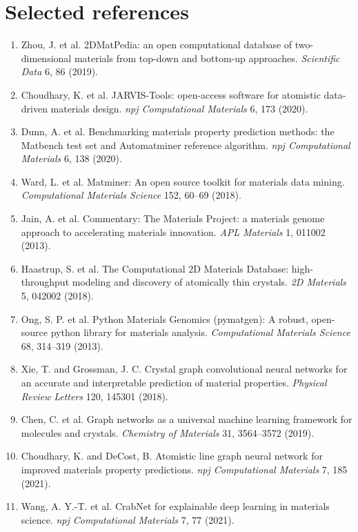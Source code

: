 \documentclass[10pt]{article}
\begin{document}
\section*{Selected references}
\small
\begin{enumerate}[leftmargin=1.2em,itemsep=1pt]
  \item Zhou, J. et al. 2DMatPedia: an open computational database of two-dimensional materials from top-down and bottom-up approaches. \textit{Scientific Data} 6, 86 (2019).
  \item Choudhary, K. et al. JARVIS-Tools: open-access software for atomistic data-driven materials design. \textit{npj Computational Materials} 6, 173 (2020).
  \item Dunn, A. et al. Benchmarking materials property prediction methods: the Matbench test set and Automatminer reference algorithm. \textit{npj Computational Materials} 6, 138 (2020).
  \item Ward, L. et al. Matminer: An open source toolkit for materials data mining. \textit{Computational Materials Science} 152, 60--69 (2018).
  \item Jain, A. et al. Commentary: The Materials Project: a materials genome approach to accelerating materials innovation. \textit{APL Materials} 1, 011002 (2013).
  \item Haastrup, S. et al. The Computational 2D Materials Database: high-throughput modeling and discovery of atomically thin crystals. \textit{2D Materials} 5, 042002 (2018).
  \item Ong, S. P. et al. Python Materials Genomics (pymatgen): A robust, open-source python library for materials analysis. \textit{Computational Materials Science} 68, 314--319 (2013).
  \item Xie, T. and Grossman, J. C. Crystal graph convolutional neural networks for an accurate and interpretable prediction of material properties. \textit{Physical Review Letters} 120, 145301 (2018).
  \item Chen, C. et al. Graph networks as a universal machine learning framework for molecules and crystals. \textit{Chemistry of Materials} 31, 3564--3572 (2019).
  \item Choudhary, K. and DeCost, B. Atomistic line graph neural network for improved materials property predictions. \textit{npj Computational Materials} 7, 185 (2021).
  \item Wang, A. Y.-T. et al. CrabNet for explainable deep learning in materials science. \textit{npj Computational Materials} 7, 77 (2021).

\end{enumerate}
\end{document}
